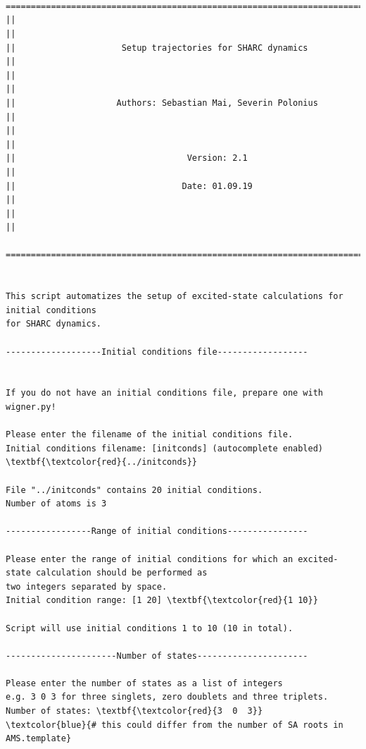 \documentclass[a4paper,11pt,DIV=15,openany]{scrbook}
\begin{document}
\begin{oframed}
\footnotesize\begin{Verbatim}[commandchars=\\\{\}]


  ================================================================================
||                                                                                ||
||                     Setup trajectories for SHARC dynamics                      ||
||                                                                                ||
||                    Authors: Sebastian Mai, Severin Polonius                    ||
||                                                                                ||
||                                  Version: 2.1                                  ||
||                                 Date: 01.09.19                                 ||
||                                                                                ||
  ================================================================================


This script automatizes the setup of excited-state calculations for initial conditions
for SHARC dynamics.
  
-------------------Initial conditions file------------------


If you do not have an initial conditions file, prepare one with wigner.py!

Please enter the filename of the initial conditions file.
Initial conditions filename: [initconds] (autocomplete enabled) \textbf{\textcolor{red}{../initconds}}

File "../initconds" contains 20 initial conditions.
Number of atoms is 3

-----------------Range of initial conditions----------------

Please enter the range of initial conditions for which an excited-state calculation should be performed as 
two integers separated by space.
Initial condition range: [1 20] \textbf{\textcolor{red}{1 10}}

Script will use initial conditions 1 to 10 (10 in total).

----------------------Number of states----------------------

Please enter the number of states as a list of integers
e.g. 3 0 3 for three singlets, zero doublets and three triplets.
Number of states: \textbf{\textcolor{red}{3  0  3}}     \textcolor{blue}{# this could differ from the number of SA roots in AMS.template}


\end{Verbatim}
\end{oframed}
\end{document}
